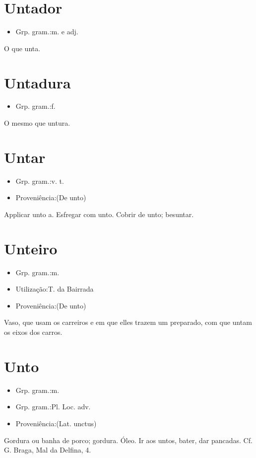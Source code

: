 \documentclass{article}
\begin{document}
\section{Untador}
\begin{itemize}
\item {Grp. gram.:m.  e  adj.}
\end{itemize}
O que unta.
\section{Untadura}
\begin{itemize}
\item {Grp. gram.:f.}
\end{itemize}
O mesmo que \textunderscore untura\textunderscore .
\section{Untar}
\begin{itemize}
\item {Grp. gram.:v. t.}
\end{itemize}
\begin{itemize}
\item {Proveniência:(De \textunderscore unto\textunderscore )}
\end{itemize}
Applicar unto a.
Esfregar com unto.
Cobrir de unto; besuntar.
\section{Unteiro}
\begin{itemize}
\item {Grp. gram.:m.}
\end{itemize}
\begin{itemize}
\item {Utilização:T. da Bairrada}
\end{itemize}
\begin{itemize}
\item {Proveniência:(De \textunderscore unto\textunderscore )}
\end{itemize}
Vaso, que usam os carreiros e em que elles trazem um preparado, com que untam os eixos dos carros.
\section{Unto}
\begin{itemize}
\item {Grp. gram.:m.}
\end{itemize}
\begin{itemize}
\item {Grp. gram.:Pl. Loc. adv.}
\end{itemize}
\begin{itemize}
\item {Proveniência:(Lat. \textunderscore unctus\textunderscore )}
\end{itemize}
Gordura ou banha de porco; gordura.
Óleo.
\textunderscore Ir aos untos\textunderscore , bater, dar pancadas. Cf. G. Braga, \textunderscore Mal da Delfina\textunderscore , 4.
\end{document}
